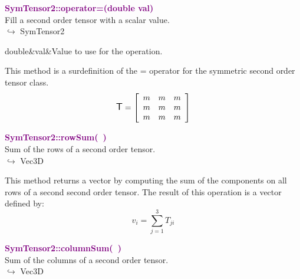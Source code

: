 \textcolor{purple}{\textbf{SymTensor2::operator=(double val)}}\label{SymTensor2::operator=(double val)}\\
Fill a second order tensor with a scalar value.\\ \hspace*{10mm}$\hookrightarrow$ SymTensor2

\begin{tcolorbox}[width=\textwidth,myArgs,tabularx={ll|R}]
double&val&Value to use for the operation.
\end{tcolorbox}

This method is a surdefinition of the = operator for the symmetric second order tensor class.
\begin{equation*}
\mbox{\large\ensuremath{\mathsf{T}}}=\left[\begin{array}{ccc}
m&m&m\\
m&m&m\\
m&m&m
\end{array}\right]
\end{equation*}

\textcolor{purple}{\textbf{SymTensor2::rowSum(~)}}\label{SymTensor2::rowSum()}\\
Sum of the rows of a second order tensor.\\ \hspace*{10mm}$\hookrightarrow$ Vec3D

This method returns a vector by computing the sum of the components on all rows of a second second order tensor.
The result of this operation is a vector defined by:
\begin{equation*}
v_{i}=\sum_{j=1}^{3} T_{ji}
\end{equation*}

\textcolor{purple}{\textbf{SymTensor2::columnSum(~)}}\label{SymTensor2::columnSum()}\\
Sum of the columns of a second order tensor.\\ \hspace*{10mm}$\hookrightarrow$ Vec3D

